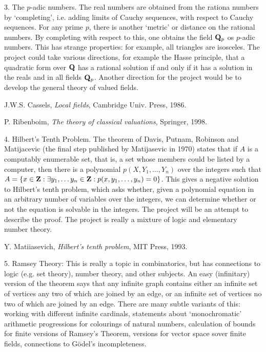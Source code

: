 \medskip

3. The $p$-adic numbers. The real numbers are obtained from the rationa numbers by `completing', i.e. adding limits of 
Cauchy sequences, with respect to 
Cauchy sequences.  For any prime $p$, there is another `metric' or distance on the rational numbers. By completing with
 respect to this, one obtains the field ${\bf Q}_p$ os $p$-adic numbers. This has strange properties: for example, all 
triangles are isosceles. The project could take various directions, for example the Hasse principle, that a quadratic form 
over ${\bf Q}$ has a rational solution if and only if it has a solution in the reals and in all fields ${\bf Q}_p$. 
Another direction for the project would be to develop the general theory of valued fields.

J.W.S. Cassels, {\em Local fields}, Cambridge Univ. Press, 1986.

P. Ribenboim, {\em The theory of classical valuations}, Springer, 1998.

\medskip

4. Hilbert's Tenth Problem. The theorem of Davis, Putnam, Robinson and Matijacevic (the final step published by
 Matijasevic in 1970)
states that if $A$ is a computably enumerable set,
that is, a set whose members could be listed  by a computer, then 
there is a polynomial $p(X,Y_1,\ldots,Y_n)$ over the integers such that
$A=\{x\in {\bf Z}: \exists y_1,\ldots y_n \in {\bf Z}: p(x,y_1,\ldots,y_n)=0\}$. 
This gives a negative solution to Hilbert's tenth problem, which asks whether, given a polynomial equation in an
 arbitrary number of variables over the 
integers, we can determine whether or not the equation is solvable in the integers. The project will be an attempt to
 describe the proof. The project is really a mixture of logic and elementary number theory.


Y. Matiiasevich, {\em Hilbert's tenth problem}, MIT Press, 1993.
\medskip

5. Ramsey Theory: This is really a topic in combinatorics, but has connections to logic (e.g. set theory), number theory, and 
other subjects. An easy (infinitary) version of the theorem says that any infinite graph contains either an infinite
 set of vertices 
any two of which are joined by an edge, or an infinite set of vertices no two of which are joined by an edge. There are 
many subtle variants of this: working with different infinite cardinals, 
statements about `monochromatic' arithmetic progressions for colourings of natural numbers, calculation of
 bounds for finite versions of Ramsey's Theorem, versions for vector space sover finite fields, 
connections to G\"odel's incompleteness.


